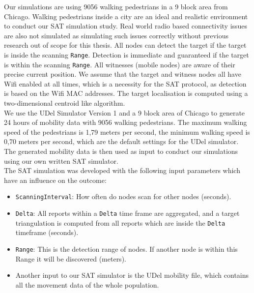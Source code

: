 \documentclass[10pt,titlepage]{article}
\begin{document}
Our simulations are using 9056 walking pedestrians in a 9 block area from Chicago. Walking pedestrians inside a city are an ideal and realistic environment to conduct our SAT simulation study. Real world radio based connectivity issues are also not simulated as simulating such issues correctly without previous research out of scope for this thesis. All nodes can detect the target if the target is inside the scanning \texttt{Range}. Detection is immediate and guaranteed if the target is within the scanning \texttt{Range}. All witnesses (mobile nodes) are aware of their precise current position. We assume that the target and witness nodes all have Wifi enabled at all times, which is a necessity for the SAT protocol, as detection is based on the Wifi MAC addresses. The target localisation is computed using a two-dimensional centroid like algorithm.\\

We use the UDel Simulator Version 1 \cite{UDEL} and a 9 block area of Chicago to generate 24 hours of mobility data with 9056 walking pedestrians. The maximum walking speed of the pedestrians is 1,79 meters per second, the minimum walking speed is 0,70 meters per second, which are the default settings for the UDel simulator. The generated mobility data is then used as input to conduct our simulations using our own written SAT simulator.\\



The SAT simulation was developed with the following input parameters which have an influence on the outcome:\\

\begin{itemize}
 \item \texttt{ScanningInterval}: How often do nodes scan for other nodes (seconds).
 \item \texttt{Delta}: All reports within a \texttt{Delta} time frame are aggregated, and a target triangulation is computed from all reports which are inside the \texttt{Delta} timeframe (seconds).
 \item \texttt{Range}: This is the detection range of nodes. If another node is within this Range it will be discovered (meters).
 \item Another input to our SAT simulator is the UDel mobility file, which contains all the movement data of the whole population.
\end{itemize}
\end{document}
